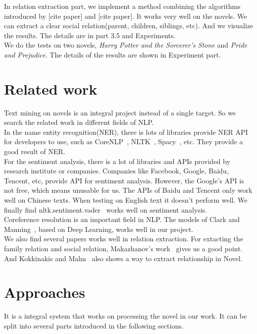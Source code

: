 \documentclass[11pt]{article}
\begin{document}
In relation extraction part, we implement a method combining the algorithms introduced by 
[cite paper] and [cite paper]. It works very well on the novels. We can extract a clear social relation(parent, children, siblings, etc). And we visualize the results. The details are in part 3.5 and Experiments. \\

We do the tests on two novels, \textit{Harry Potter and the Sorcerer's Stone} and \textit{Pride and Prejudice}. The details of the results are shown in Experiment part.

\section{Related work} %
Text mining on novels is an integral project instead of a single target. So we search the related work in different fields of NLP.\\

In the name entity recognition(NER), there is lots of libraries provide NER API for developers to use, such as CoreNLP~\cite{corenlp}, NLTK~\cite{Loper02nltk:the}, Spacy~\cite{honnibal-johnson:2015:EMNLP}, etc. They provide a good result of NER.\\

For the sentiment analysis, there is a lot of libraries and APIs provided by research institute or companies. Companies like Facebook, Google, Baidu, Tencent, etc, provide API 
for sentiment analysis. However, the Google's API is not free, which means unusable for us. The APIs of Baidu and Tencent only work well on Chinese texts. When testing on English text it doesn't perform well. We finally find nltk.sentiment.vader~\cite{Vader} works well on sentiment analysis. \\

Coreference resolution is an important field in NLP. The models of Clark and Manning~\cite{clark-manning-2016-deep}, based on Deep Learning, works well in our project. \\

We also find several papers works well in relation extraction. For extacting the family relation and social relation, Makazhanov's work~\cite{Makazhanov2014ExtractingFR} gives us a good point. And Kokkinakis and Malm~\cite{kokkinakis-malm-2011-character} also shows a way to extract relationship in Novel.


\section{Approaches}
It is a integral system that works on processing the novel in our work. It can be split into several parts introduced in the following sections.
\end{document}
